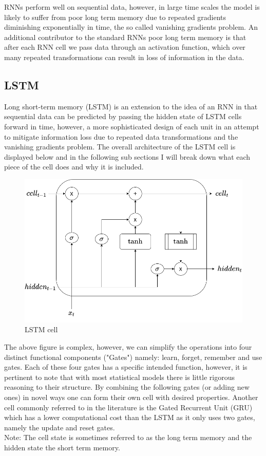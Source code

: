 \documentclass{article}
\begin{document}
RNNs perform well on sequential data, however, in large time scales the model is likely to suffer from poor long term memory due to repeated gradients diminishing exponentially in time, the so called vanishing gradients problem. An additional contributor to the standard RNNs poor long term memory is that after each RNN cell we pass data through an activation function, which over many repeated transformations can result in loss of information in the data. 
\subsection{LSTM}
\label{sec:LSTM}
Long short-term memory (LSTM) is an extension to the idea of an RNN in that sequential data can be predicted by passing the hidden state of LSTM cells forward in time, however, a more sophisticated design of each unit in an attempt to mitigate information loss due to repeated data transformations and the vanishing gradients problem. The overall architecture of the LSTM cell is displayed below and in the following sub sections I will break down what each piece of the cell does and why it is included. 
\begin{figure}[H]
\centering
\caption{LSTM cell \cite{LSTM}}
\label{fig:LSTMCell}
\includegraphics[scale=0.4]{LSTM_cell.png}
\end{figure}
The above figure is complex, however, we can simplify the operations into four distinct functional components ("Gates") namely: learn, forget, remember and use gates. Each of these four gates has a specific intended function, however, it is pertinent to note that with most statistical models there is little rigorous reasoning to their structure. By combining the following gates (or adding new ones) in novel ways one can form their own cell with desired properties. Another cell commonly referred to in the literature is the Gated Recurrent Unit (GRU) which has a lower computational cost than the LSTM as it only uses two gates, namely the update and reset gates.\\
Note: The cell state is sometimes referred to as the long term memory and the hidden state the short term memory.
\end{document}
